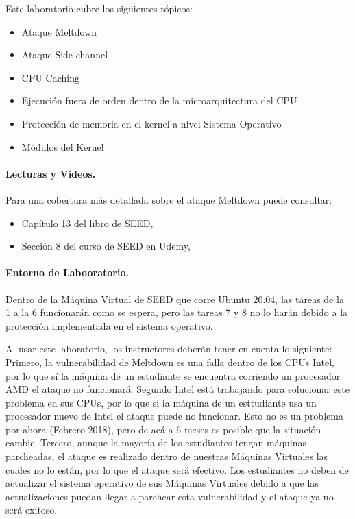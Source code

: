 Este laboratorio cubre los siguientes tópicos:

\begin{itemize}[noitemsep]
\item Ataque Meltdown 
\item Ataque Side channel 
\item CPU Caching
\item Ejecución fuera de orden dentro de la microarquitectura del CPU
\item Protección de memoria en el kernel a nivel Sistema Operativo
\item Módulos del Kernel
\end{itemize} 


\paragraph{Lecturas y Videos.}
Para una cobertura más detallada sobre el ataque Meltdown puede consultar:

\begin{itemize}
\item Capítulo 13 del libro de SEED, \seedbook
\item Sección 8 del curso de SEED en Udemy, \seedcsvideo
\end{itemize}



\paragraph{Entorno de Labooratorio.} \seedenvironment Dentro de la Máquina Virtual de SEED que corre Ubuntu 20.04, las tareas de la 1 a la 6 funcionarán como se espera, pero las tareas 7 y 8 no lo harán debido a la protección implementada en el sistema operativo.

Al usar este laboratorio, los instructores deberán tener en cuenta lo siguiente:
Primero, la vulnerabilidad de Meltdown es una falla dentro de los CPUs Intel, por lo que sí la máquina de un estudiante se encuentra corriendo un procesador AMD el ataque no funcionará. 
Segundo Intel está trabajando para solucionar este problema en sus CPUs, por lo que si la máquina de un esttudiante usa un procesador nuevo de Intel el ataque puede no funcionar. Esto no es un problema por ahora (Febrero 2018), pero de acá a 6 meses es posible que la situación cambie.
Tercero, aunque la mayoría de los estudiantes tengan máquinas parcheadas, el ataque es realizado dentro de nuestras Máquinas Virtuales las cuales no lo están, por lo que el ataque será efectivo.
Los estudiantes no deben de actualizar el sistema operativo de sus Máquinas Virtuales debido a que las actualizaciones puedan llegar a parchear esta vulnerabilidad y el ataque ya no será exitoso.


